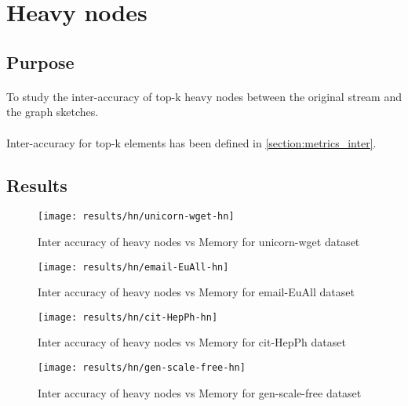 \section{Heavy nodes}
\label{section:heavy_nodes}

\subsection*{Purpose}

\paragraph{}
To study the inter-accuracy of top-k heavy nodes between the original stream and the graph sketches.

\paragraph{}
Inter-accuracy for top-k elements has been defined in \autoref{section:metrics_inter}.

\subsection*{Results}

\begin{figure}[H]
    \centering \texttt{[image: results/hn/unicorn-wget-hn]}
    \vspace{-0.5cm}
    \caption{Inter accuracy of heavy nodes vs Memory for unicorn-wget dataset}
    \label{fig:unicorn-wget-hn}
\end{figure}

\begin{figure}[H]
    \centering \texttt{[image: results/hn/email-EuAll-hn]}
    \vspace{-0.5cm}
    \caption{Inter accuracy of heavy nodes vs Memory for email-EuAll dataset}
    \label{fig:email-EuAll-hn}
\end{figure}

\begin{figure}[H]
    \centering \texttt{[image: results/hn/cit-HepPh-hn]}
    \vspace{-0.5cm}
    \caption{Inter accuracy of heavy nodes vs Memory for cit-HepPh dataset}
    \label{fig:cit-HepPh-hn}
\end{figure}

\begin{figure}[H]
    \centering \texttt{[image: results/hn/gen-scale-free-hn]}
    \vspace{-0.5cm}
    \caption{Inter accuracy of heavy nodes vs Memory for gen-scale-free dataset}
    \label{fig:gen-scale-free-hn}
\end{figure}

